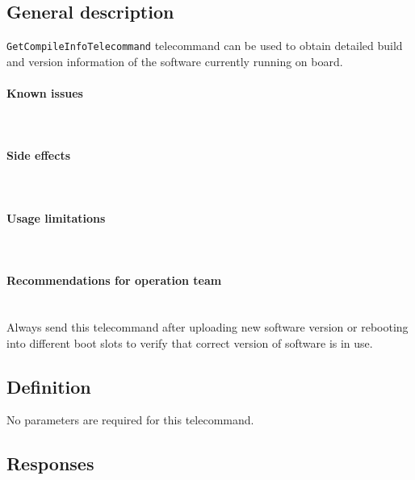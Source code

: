 

\subsection{General description}
\texttt{GetCompileInfoTelecommand} telecommand can be used to obtain detailed build and version information of the software currently running on board.

\paragraph{Known issues} \mbox{} \\
\None

\paragraph{Side effects} \mbox{} \\
\None

\paragraph{Usage limitations} \mbox{} \\
\None

\paragraph{Recommendations for operation team} \mbox{} \\
Always send this telecommand after uploading new software version or rebooting into different boot slots to verify that correct version of \OBC software is in use.

\subsection{Definition}

No parameters are required for this telecommand.

\subsection{Responses}

